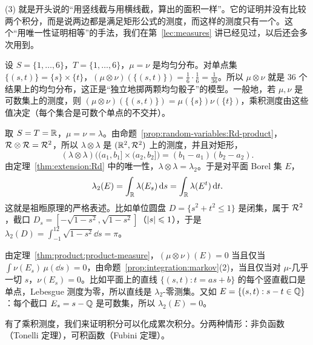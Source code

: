 \begin{remark}
(3) 就是开头说的“用竖线截与用横线截，算出的面积一样”。它的证明并没有比较两个积分，而是说两边都是满足矩形公式的测度，而这样的测度只有一个。这个“用唯一性证明相等”的手法，我们在第~\ref{lec:measures} 讲已经见过，以后还会多次用到。
\end{remark}

\begin{example}[有限集合上的乘积测度]\label{ex:product:finite}
设 $S=\{1,\dots,6\}$，$T=\{1,\dots,6\}$，$\mu=\nu$ 是均匀分布。对单点集 $\{(s,t)\}=\{s\}\times\{t\}$，$(\mu\otimes\nu)(\{(s,t)\})=\frac16\cdot\frac16=\frac1{36}$。所以 $\mu\otimes\nu$ 就是 $36$ 个结果上的均匀分布，这正是“独立地掷两颗均匀骰子”的模型。一般地，若 $\mu,\nu$ 是可数集上的测度，则 $(\mu\otimes\nu)(\{(s,t)\})=\mu(\{s\})\nu(\{t\})$，乘积测度由这些值决定（每个集合是可数个单点的不交并）。
\end{example}

\begin{example}\label{ex:product:lebesgue}
取 $S=T=\mathbb{R}$，$\mu=\nu=\lambda$。由命题~\ref{prop:random-variables:Rd-product}，$\mathcal{R}\otimes\mathcal{R}=\mathcal{R}^2$，所以 $\lambda\otimes\lambda$ 是 $(\mathbb{R}^2,\mathcal{R}^2)$ 上的测度，并且对矩形，
\[
(\lambda\otimes\lambda)\bigl((a_1,b_1]\times(a_2,b_2]\bigr)=(b_1-a_1)(b_2-a_2).
\]
由定理~\ref{thm:extension:Rd} 中的唯一性，$\lambda\otimes\lambda=\lambda_2$。于是对平面 Borel 集 $E$，
\[
\lambda_2(E)=\int_{\mathbb{R}}\lambda(E_s)\,\mathrm{d} s=\int_{\mathbb{R}}\lambda(E^t)\,\mathrm{d} t .
\]
这就是祖暅原理的严格表述。比如单位圆盘 $D=\{s^2+t^2\leqslant1\}$ 是闭集，属于 $\mathcal{R}^2$，截口 $D_s=[-\sqrt{1-s^2},\sqrt{1-s^2}]$（$\lvert s\rvert\leqslant1$），于是 $\lambda_2(D)=\int_{-1}^12\sqrt{1-s^2}\dd s=\pi$。
\end{example}

\begin{example}[零测集的刻画]\label{ex:product:null}
由定理~\ref{thm:product:product-measure}，$(\mu\otimes\nu)(E)=0$ 当且仅当 $\int\nu(E_s)\,\mu(\dd s)=0$，由命题~\ref{prop:integration:markov}(2)，当且仅当对 $\mu$-几乎一切 $s$，$\nu(E_s)=0$。比如平面上的直线 $\{(s,t):t=as+b\}$ 的每个竖直截口是单点，Lebesgue 测度为零，所以直线是 $\lambda_2$-零测集。又如 $E=\{(s,t):s-t\in\mathbb{Q}\}$：每个截口 $E_s=s-\mathbb{Q}$ 是可数集，所以 $\lambda_2(E)=0$。
\end{example}


有了乘积测度，我们来证明积分可以化成累次积分。分两种情形：非负函数（Tonelli 定理），可积函数（Fubini 定理）。

